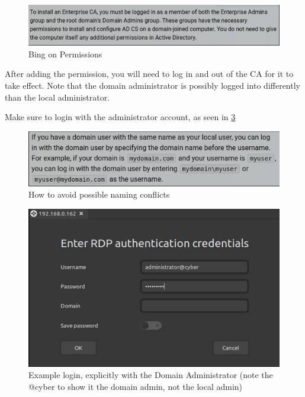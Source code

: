 \documentclass{article}
\begin{document}
\begin{figure}[H]
        \centering
        \includegraphics[width=1\textwidth]{BingOnPermissions.png}
        \caption{Bing on Permissions}
        \label{fig:BingOnPermissions}
\end{figure}

After adding the permission, you will need to log in and out of the CA for it to take effect.
Note that the domain administrator is possibly logged into differently than the local administrator.

Make sure to login with the administrator account, as seen in \ref{fig:ExampleLoginNETBIOS}

\begin{figure}[H]
        \centering
        \includegraphics[width=1\textwidth]{BingDomainUserAdminUser.png}
        \caption{How to avoid possible naming conflicts}
        \label{fig:BingDomainUserAdminUser}
\end{figure}

\begin{figure}[H]
        \centering
        \includegraphics[width=1\textwidth]{ExampleLoginNETBIOS.png}
        \caption{Example login, explicitly with the Domain Administrator (note the @cyber to show it the domain admin, not the local admin)}
        \label{fig:ExampleLoginNETBIOS}
\end{figure}
\end{document}
